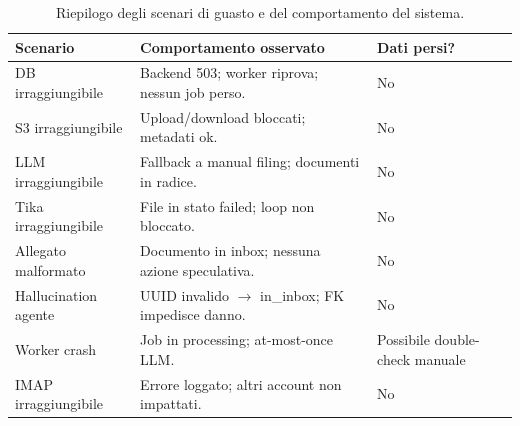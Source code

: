 \begin{table}[ht]
\centering
\small
\begin{tabularx}{\linewidth}{l X l}
\toprule
\textbf{Scenario} & \textbf{Comportamento osservato} & \textbf{Dati persi?} \\
\midrule
DB irraggiungibile        & Backend 503; worker riprova; nessun job perso.         & No \\
S3 irraggiungibile        & Upload/download bloccati; metadati ok.                  & No \\
LLM irraggiungibile       & Fallback a manual filing; documenti in radice.          & No \\
Tika irraggiungibile      & File in stato failed; loop non bloccato.                & No \\
Allegato malformato       & Documento in inbox; nessuna azione speculativa.         & No \\
Hallucination agente      & UUID invalido $\rightarrow$ in\_inbox; FK impedisce danno. & No \\
Worker crash              & Job in processing; at-most-once LLM.                   & Possibile double-check manuale \\
IMAP irraggiungibile      & Errore loggato; altri account non impattati.            & No \\
\bottomrule
\end{tabularx}
\caption{Riepilogo degli scenari di guasto e del comportamento del sistema.}
\label{tab:fail_riepilogo}
\end{table}
